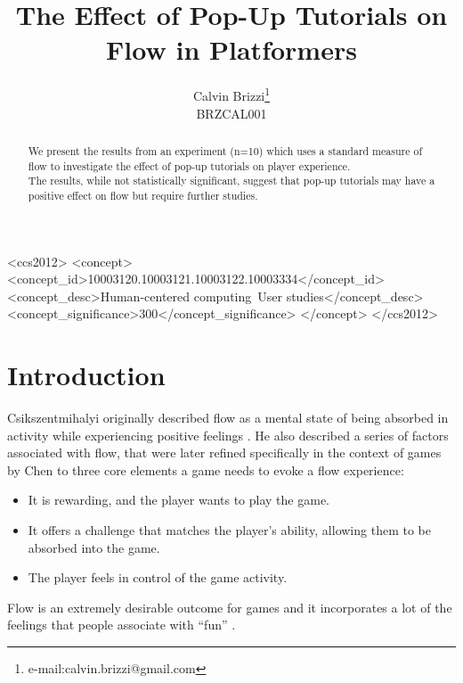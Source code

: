 \documentclass{acmsiggraph}
\title{The Effect of Pop-Up Tutorials on Flow in Platformers}
\author{Calvin Brizzi\thanks{e-mail:calvin.brizzi@gmail.com}\\BRZCAL001}
\begin{document}


\maketitle

\begin{abstract}

We present the results from an experiment (n=10) which uses a standard measure of flow to investigate the effect of pop-up tutorials on player experience.\\
The results, while not statistically significant, suggest that pop-up tutorials may have a positive effect on flow but require further studies.

\end{abstract}

%
%
\begin{CCSXML}
<ccs2012>
<concept>
<concept_id>10003120.10003121.10003122.10003334</concept_id>
<concept_desc>Human-centered computing~User studies</concept_desc>
<concept_significance>300</concept_significance>
</concept>
</ccs2012>
\end{CCSXML}


%
%


\keywordlist

\conceptlist

\printcopyright

\section{Introduction}
Csikszentmihalyi originally described flow as a mental state of being absorbed in activity while experiencing positive feelings \cite{optimal}. He also described a series of factors associated with flow, that were later refined specifically in the context of games by Chen \cite{flow} to three core elements a game needs to evoke a flow experience:
\begin{itemize}
\item It is rewarding, and the player wants to play the game.
\item It offers a challenge that matches the player’s ability, allowing them to be absorbed into the game.
\item The player feels in control of the game activity.
\end{itemize}
Flow is an extremely desirable outcome for games and it incorporates a lot of the feelings that people associate with ``fun'' \cite{flow}.
\end{document}
